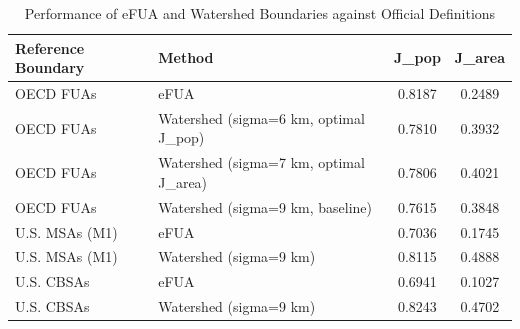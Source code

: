 \begin{table}[!h]
\centering
\caption{\label{tab:jaccard_comparison}Performance of eFUA and Watershed Boundaries against Official Definitions}
\centering
\begin{tabular}[t]{llcc}
\toprule
Reference Boundary & Method & J_pop & J_area\\
\midrule
OECD FUAs & eFUA & 0.8187 & 0.2489\\
OECD FUAs & Watershed (sigma=6 km, optimal J_pop) & 0.7810 & 0.3932\\
OECD FUAs & Watershed (sigma=7 km, optimal J_area) & 0.7806 & 0.4021\\
OECD FUAs & Watershed (sigma=9 km, baseline) & 0.7615 & 0.3848\\
U.S. MSAs (M1) & eFUA & 0.7036 & 0.1745\\
\addlinespace
U.S. MSAs (M1) & Watershed (sigma=9 km) & 0.8115 & 0.4888\\
U.S. CBSAs & eFUA & 0.6941 & 0.1027\\
U.S. CBSAs & Watershed (sigma=9 km) & 0.8243 & 0.4702\\
\bottomrule
\end{tabular}
\end{table}
